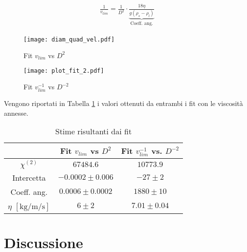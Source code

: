 \documentclass[a4paper,11pt,oneside]{article}
\begin{document}
\begin{align*}
\begin{split}
     \frac{1}{v_{lim}}= \frac{1}{D^{2}} \cdot \underbrace{\frac{18 \eta}{g (\rho_s - \rho_l)}}_\text{Coeff. ang.}
\end{split}
\end{align*}

\begin{figure}
    \centering
    \texttt{[image: diam\_quad\_vel.pdf]}
    \caption{Fit $v_{lim}$ vs $D^{2}$}
    \label{fig:verifica_legge_1}
\end{figure}

\begin{figure}
    \centering
    \texttt{[image: plot\_fit\_2.pdf]}
    \caption{Fit $v_{lim}^{-1}$ vs $D^{-2}$}
    \label{fig:verifica_legge_2}
\end{figure}

Vengono riportati in Tabella \ref{tab:fit} i valori ottenuti da entrambi i fit con le viscosità annesse.

\begin{table}[h!] %
\centering
    \begin{tabular}{|c|c|c|} \hline
        & Fit $v_{lim}$ vs $D^{2}$ & Fit $v_{lim}^{-1}$ vs. $D^{-2}$ \\ \hline
        \rowcolor[rgb]{0.85,0.85,0.85}${\chi}^{(2)}$ & $67484.6$ & $10773.9$ \\ \hline
        Intercetta & $-0.0002 \pm 0.006$ & $-27 \pm 2$ \\ \hline
        \rowcolor[rgb]{0.85,0.85,0.85}Coeff. ang. & $0.0006 \pm 0.0002$ & $1880 \pm 10$ \\ \hline
        $\eta$ $[\si{\kilo\gram\per\metre\per\second}]$ & $6 \pm 2$ & $7.01 \pm 0.04$ \\ \hline
    \end{tabular}
\caption{Stime risultanti dai fit}
\label{tab:fit}
\end{table}


\section{Discussione}
\end{document}
